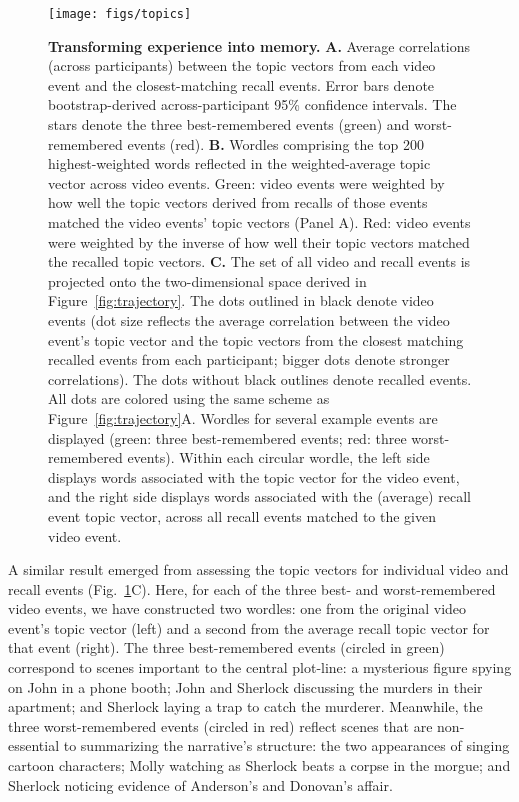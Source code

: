 \documentclass{article}
\begin{document}
\begin{figure}[tp]
\centering
\texttt{[image: figs/topics]}
\caption{\small \textbf{Transforming experience into memory.} \textbf{A.} Average correlations (across participants) between the topic vectors from each video event and the closest-matching recall events.  Error bars denote bootstrap-derived across-participant 95\% confidence intervals.  The stars denote the three best-remembered events (green) and worst-remembered events (red).  \textbf{B.} Wordles comprising the top 200 highest-weighted words reflected in the weighted-average topic vector across video events.  Green: video events were weighted by how well the topic vectors derived from recalls of those events matched the video events' topic vectors (Panel A).  Red: video events were weighted by the inverse of how well their topic vectors matched the recalled topic vectors.  \textbf{C.}  The set of all video and recall events is projected onto the two-dimensional space derived in Figure~\ref{fig:trajectory}.  The dots outlined in black denote video events (dot size reflects the average correlation between the video event's topic vector and the topic vectors from the closest matching recalled events from each participant; bigger dots denote stronger correlations).  The dots without black outlines denote recalled events.  All dots are colored using the same scheme as Figure~\ref{fig:trajectory}A.  Wordles for several example events are displayed (green: three best-remembered events; red: three worst-remembered events).  Within each circular wordle, the left side displays words associated with the topic vector for the video event, and the right side displays words associated with the (average) recall event topic vector, across all recall events matched to the given video event.}
\label{fig:topics}
\end{figure}

A similar result emerged from assessing the topic vectors for individual video and recall events (Fig.~\ref{fig:topics}C).  Here, for each of the three best- and worst-remembered video events, we have constructed two wordles: one from the original video event's topic vector (left) and a second from the average recall topic vector for that event (right).  The three best-remembered events (circled in green) correspond to scenes important to the central plot-line: a mysterious figure spying on John in a phone booth; John and Sherlock discussing the murders in their apartment; and Sherlock laying a trap to catch the murderer.  Meanwhile, the three worst-remembered events (circled in red) reflect scenes that are non-essential to summarizing the narrative's structure: the two appearances of singing cartoon characters; Molly watching as Sherlock beats a corpse in the morgue; and Sherlock noticing evidence of Anderson's and Donovan's affair.
\end{document}
